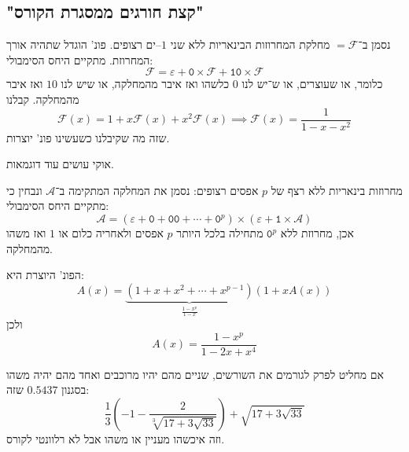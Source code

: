 \documentclass[]{article}
\newcommand\ac    {\mathcal{A}}
\newcommand\fc    {\mathcal{F}}
\newcommand\epsi  {\varepsilon}
\newcommand\cl [1]    {\left ( #1 \right )}
\begin{document}
	 
	 \subsection{"קצת חורגים ממסגרת הקורס"}
	 נסמן ב־$=\fc$ מחלקת המחרוזות הבינאריות ללא שני $1$–ים רצופים. פונ' הוגדל שתהיה אורך המחרוזת. מתקיים היחס הסימבולי: 
	 \[ \fc = \epsi + \texttt{0} \times \fc + \texttt{10} \times \fc \]
	 כלומר, או שעוצרים, או ש־יש לנו $0$ כלשהו ואז איבר מהמחלקה, או שיש לנו $10$ ואז איבר מהמחלקה. 
	 קבלנו
	 \[ \fc(x) = 1 + x\fc(x) + x^{2}\fc(x) \implies \fc(x) = \frac{1}{1 - x - x^{2}} \]
	 שזה מה שקיבלנו כשעשינו פונ' יוצרות.
	 
	 אוקי עושים עוד דוגמאות. 
	 
	 מחרוזות בינאריות ללא רצף של $p$ אפסים רצופים: נסמן את המחלקה המתקימה ב־$\ac$ ונבחין כי מתקיים היחס הסימבולי: 
	 \[ \ac = (\epsi + \texttt{0} + \texttt{00} + \cdots + \texttt{0}^{p}) \times (\epsi + \texttt{1} \times \ac) \]
	 אכן, מחרוזת ללא $\texttt{0}^{p}$ מתחילה בלכל היותר $p$ אפסים ולאחריה כלום או $1$ ואז משהו מהמחלקה. 
	 
	 הפונ' היוצרת היא: 
	 \[ A(x) = \underbrace{(1 + x + x^{2} + \cdots + x^{p - 1})}_{\frac{1 - x^p}{1 - x}}(1 + xA(x)) \]
	 ולכן 
	 \[ A(x) = \frac{1 - x^p}{1 - 2x + x^4} \]
	 
	 אם מחליט לפרק לגורמים את השורשים, שניים מהם יהיו מרוכבים ואחד מהם יהיה משהו בסגנון $0.5437$ שזה: 
	 \[ \frac{1}{3}\cl{-1 - \frac{2}{\sqrt[3]{17 + 3\sqrt{33}}}} + \sqrt{17 + 3\sqrt{33}}  \]
	 וזה איכשהו מעניין או משהו אבל לא רלוונטי לקורס. 
	 
\end{document}
